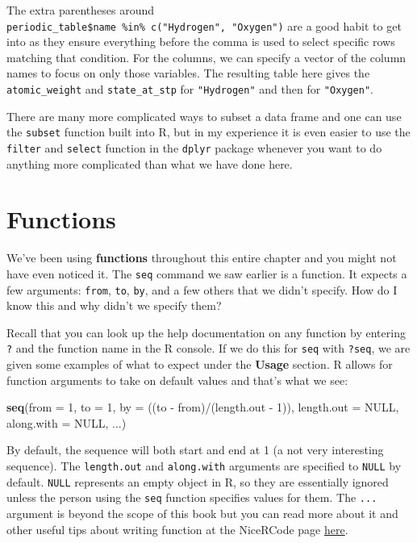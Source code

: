 \documentclass[]{tufte-book}
\newenvironment{Shaded}{\begin{snugshade}}{\end{snugshade}}
\newcommand{\KeywordTok}[1]{\textcolor[rgb]{0.13,0.29,0.53}{\textbf{{#1}}}}
\newcommand{\DataTypeTok}[1]{\textcolor[rgb]{0.13,0.29,0.53}{{#1}}}
\newcommand{\DecValTok}[1]{\textcolor[rgb]{0.00,0.00,0.81}{{#1}}}
\newcommand{\StringTok}[1]{\textcolor[rgb]{0.31,0.60,0.02}{{#1}}}
\newcommand{\OtherTok}[1]{\textcolor[rgb]{0.56,0.35,0.01}{{#1}}}
\newcommand{\NormalTok}[1]{{#1}}
\theoremstyle{definition}
\theoremstyle{definition}
\theoremstyle{remark}
\begin{document}
The extra parentheses around
\texttt{periodic\_table\$name\ \%in\%\ c("Hydrogen",\ "Oxygen")} are a
good habit to get into as they ensure everything before the comma is
used to select specific rows matching that condition. For the columns,
we can specify a vector of the column names to focus on only those
variables. The resulting table here gives the \texttt{atomic\_weight}
and \texttt{state\_at\_stp} for \texttt{"Hydrogen"} and then for
\texttt{"Oxygen"}.

There are many more complicated ways to subset a data frame and one can
use the \texttt{subset} function built into R, but in my experience it
is even easier to use the \texttt{filter} and \texttt{select} function
in the \texttt{dplyr} package whenever you want to do anything more
complicated than what we have done here.

\section{Functions}\label{functions}

We've been using \textbf{functions} throughout this entire chapter and
you might not have even noticed it. The \texttt{seq} command we saw
earlier is a function. It expects a few arguments: \texttt{from},
\texttt{to}, \texttt{by}, and a few others that we didn't specify. How
do I know this and why didn't we specify them?

Recall that you can look up the help documentation on any function by
entering \texttt{?} and the function name in the R console. If we do
this for \texttt{seq} with \texttt{?seq}, we are given some examples of
what to expect under the \textbf{Usage} section. R allows for function
arguments to take on default values and that's what we see:

\begin{Shaded}
\begin{Highlighting}[]
\KeywordTok{seq}\NormalTok{(}\DataTypeTok{from =} \DecValTok{1}\NormalTok{, }\DataTypeTok{to =} \DecValTok{1}\NormalTok{, }\DataTypeTok{by =} \NormalTok{((to -}\StringTok{ }\NormalTok{from)/(length.out -}\StringTok{ }\DecValTok{1}\NormalTok{)),}
    \DataTypeTok{length.out =} \OtherTok{NULL}\NormalTok{, }\DataTypeTok{along.with =} \OtherTok{NULL}\NormalTok{, ...)}
\end{Highlighting}
\end{Shaded}

By default, the sequence will both start and end at 1 (a not very
interesting sequence). The \texttt{length.out} and \texttt{along.with}
arguments are specified to \texttt{NULL} by default. \texttt{NULL}
represents an empty object in R, so they are essentially ignored unless
the person using the \texttt{seq} function specifies values for them.
The \texttt{...} argument is beyond the scope of this book but you can
read more about it and other useful tips about writing function at the
NiceRCode page
\href{http://nicercode.github.io/guides/functions/}{here}.
\end{document}
